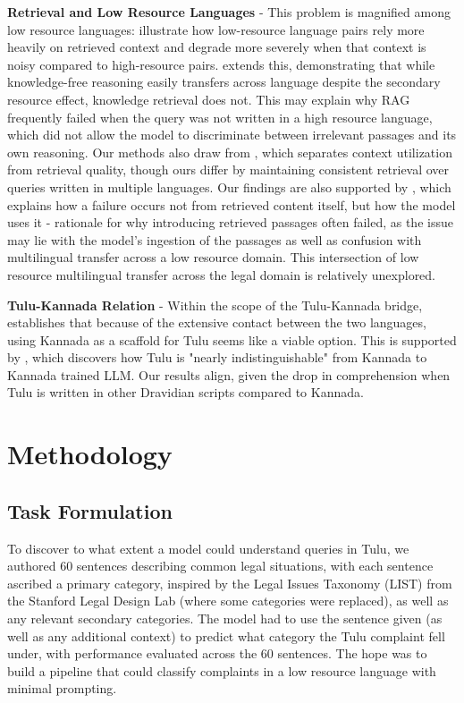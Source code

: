 \documentclass[11pt]{article}
\begin{document}
\textbf{Retrieval and Low Resource Languages} - This problem is magnified among low resource languages: \citep{sun2026exposing} illustrate how low-resource language pairs rely more heavily on retrieved context and degrade more severely when that context is noisy compared to high-resource pairs. \citep{hu2025crosslingual} extends this, demonstrating that while knowledge-free reasoning easily transfers across language despite the secondary resource effect, knowledge retrieval does not. This may explain why RAG frequently failed when the query was not written in a high resource language, which did not allow the model to discriminate between irrelevant passages and its own reasoning. Our methods also draw from \citep{qi2025consistency}, which separates context utilization from retrieval quality, though ours differ by maintaining consistent retrieval over queries written in multiple languages. Our findings are also supported by \citep{mohan2026retrieval}, which explains how a failure occurs not from retrieved content itself, but how the model uses it - rationale for why introducing retrieved passages often failed, as the issue may lie with the model's ingestion of the passages as well as confusion with multilingual transfer across a low resource domain. This intersection of low resource multilingual transfer across the legal domain is relatively unexplored. 

\textbf{Tulu-Kannada Relation} - Within the scope of the Tulu-Kannada bridge, \citep{madasamy2024tulu} establishes that because of the extensive contact between the two languages, using Kannada as a scaffold for Tulu seems like a viable option. This is supported by \citep{devadiga2026making}, which discovers how Tulu is "nearly indistinguishable" from Kannada to Kannada trained LLM. Our results align, given the drop in comprehension when Tulu is written in other Dravidian scripts compared to Kannada. 



\section{Methodology}

\subsection{Task Formulation}
To discover to what extent a model could understand queries in Tulu, we authored 60 sentences describing common legal situations, with each sentence ascribed a primary category, inspired by the Legal Issues Taxonomy (LIST) from the Stanford Legal Design Lab \citep{stanfordlegaldesignlab_list} (where some categories were replaced), as well as any relevant secondary categories. The model had to use the sentence given (as well as any additional context) to predict what category the Tulu complaint fell under, with performance evaluated across the 60 sentences. The hope was to build a pipeline that could classify complaints in a low resource language with minimal prompting.
\end{document}
